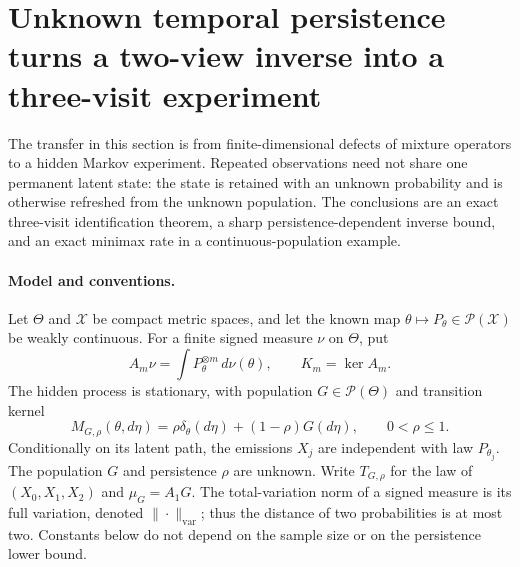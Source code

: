 \documentclass[11pt,a4paper]{article}
\theoremstyle{definition}
\theoremstyle{remark}
\numberwithin{equation}{section}
\begin{document}


\section{Unknown temporal persistence turns a two-view inverse into a three-visit experiment}
\label{p1:sec:stat-refresh}

The transfer in this section is from finite-dimensional defects of mixture
operators to a hidden Markov experiment.  Repeated observations need not share
one permanent latent state: the state is retained with an unknown probability
and is otherwise refreshed from the unknown population.  The conclusions are
an exact three-visit identification theorem, a sharp persistence-dependent
inverse bound, and an exact minimax rate in a continuous-population example.

\paragraph{Model and conventions.}
Let $\Theta$ and $\mathcal X$ be compact metric spaces, and let the known map
$\theta\mapsto P_\theta\in\mathcal P(\mathcal X)$ be weakly continuous.  For
a finite signed measure $\nu$ on $\Theta$, put
\[
 A_m\nu=\int P_\theta^{\otimes m}\,d\nu(\theta),\qquad K_m=\ker A_m.
\]
The hidden process is stationary, with population $G\in\mathcal P(\Theta)$
and transition kernel
\begin{equation}\label{p1:eq:stat-refresh-transition}
 M_{G,\rho}(\theta,d\eta)
   =\rho\delta_\theta(d\eta)+(1-\rho)G(d\eta),\qquad 0<\rho\le1.
\end{equation}
Conditionally on its latent path, the emissions $X_j$ are independent with
law $P_{\theta_j}$.  The population $G$ and persistence $\rho$ are unknown.
Write $T_{G,\rho}$ for the law of $(X_0,X_1,X_2)$ and
$\mu_G=A_1G$.  The total-variation norm of a signed measure is its full
variation, denoted $\|\cdot\|_{\mathrm{var}}$; thus the distance of two
probabilities is at most two.  Constants below do not depend on the sample
size or on the persistence lower bound.
\end{document}
